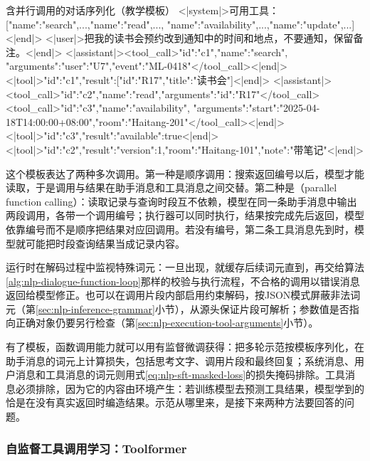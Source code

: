 \begin{codeblock}[label={code:nlp-execution-call-template}]{含并行调用的对话序列化（教学模板）}
<|system|>可用工具：[{"name":"search",...},{"name":"read",...},
  {"name":"availability",...},{"name":"update",...}]<|end|>
<|user|>把我的读书会预约改到通知中的时间和地点，不要通知，保留备注。<|end|>
<|assistant|><tool_call>{"id":"c1","name":"search",
  "arguments":{"user":"U7","event":"ML-0418"}}</tool_call><|end|>
<|tool|>{"id":"c1","result":[{"id":"R17","title":"读书会"}]}<|end|>
<|assistant|><tool_call>{"id":"c2","name":"read","arguments":{"id":"R17"}}</tool_call>
<tool_call>{"id":"c3","name":"availability",
  "arguments":{"start":"2025-04-18T14:00:00+08:00","room":"Haitang-201"}}</tool_call><|end|>
<|tool|>{"id":"c3","result":{"available":true}}<|end|>
<|tool|>{"id":"c2","result":{"version":1,"room":"Haitang-101","note":"带笔记"}}<|end|>
\end{codeblock}

这个模板表达了两种多次调用。第一种是顺序调用：搜索返回编号以后，模型才能读取，于是调用与结果在助手消息和工具消息之间交替。第二种是（parallel function calling）：读取记录与查询时段互不依赖，模型在同一条助手消息中输出两段调用，各带一个调用编号；执行器可以同时执行，结果按完成先后返回，模型依靠编号而不是顺序把结果对应回调用。若没有编号，第二条工具消息先到时，模型就可能把时段查询结果当成记录内容。

运行时在解码过程中监视特殊词元：一旦出现，就缓存后续词元直到，再交给算法\ref{alg:nlp-dialogue-function-loop}那样的校验与执行流程，不合格的调用以错误消息返回给模型修正。也可以在调用片段内部启用约束解码，按JSON模式屏蔽非法词元（第\ref{sec:nlp-inference-grammar}小节），从源头保证片段可解析；参数值是否指向正确对象仍要另行检查（第\ref{sec:nlp-execution-tool-arguments}小节）。

有了模板，函数调用能力就可以用有监督微调获得：把多轮示范按模板序列化，在助手消息的词元上计算损失，包括思考文字、调用片段和最终回复；系统消息、用户消息和工具消息的词元则用式\eqref{eq:nlp-sft-masked-loss}的损失掩码排除。工具消息必须排除，因为它的内容由环境产生：若训练模型去预测工具结果，模型学到的恰是在没有真实返回时编造结果。示范从哪里来，是接下来两种方法要回答的问题。

\subsubsection{自监督工具调用学习：Toolformer}
\label{sec:nlp-execution-toolformer}

